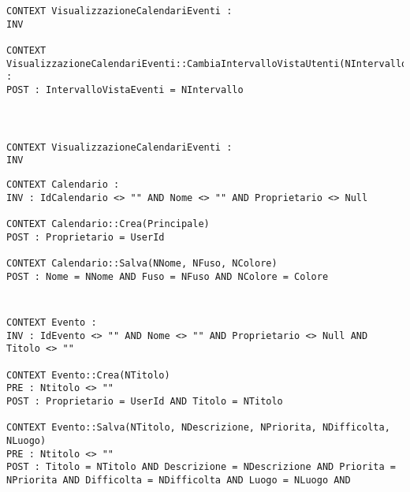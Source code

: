 \begin{listaPersonale}[OCL]{}
    \begin{lstlisting}
CONTEXT VisualizzazioneCalendariEventi :
INV 

CONTEXT VisualizzazioneCalendariEventi::CambiaIntervalloVistaUtenti(NIntervallo) :
POST : IntervalloVistaEventi = NIntervallo
    \end{lstlisting}
    \begin{lstlisting}
    \end{lstlisting}
    \begin{lstlisting}
    \end{lstlisting}
    \begin{lstlisting}
    \end{lstlisting}




    \begin{lstlisting}
CONTEXT VisualizzazioneCalendariEventi :
INV 
    \end{lstlisting}




    \begin{lstlisting}
CONTEXT Calendario :
INV : IdCalendario <> "" AND Nome <> "" AND Proprietario <> Null

CONTEXT Calendario::Crea(Principale)
POST : Proprietario = UserId

CONTEXT Calendario::Salva(NNome, NFuso, NColore)
POST : Nome = NNome AND Fuso = NFuso AND NColore = Colore 
    \end{lstlisting}




    \begin{lstlisting}
    \end{lstlisting}




    \begin{lstlisting}
    \end{lstlisting}




    \begin{lstlisting}
CONTEXT Evento :
INV : IdEvento <> "" AND Nome <> "" AND Proprietario <> Null AND Titolo <> ""

CONTEXT Evento::Crea(NTitolo)
PRE : Ntitolo <> ""
POST : Proprietario = UserId AND Titolo = NTitolo

CONTEXT Evento::Salva(NTitolo, NDescrizione, NPriorita, NDifficolta, NLuogo)
PRE : Ntitolo <> ""
POST : Titolo = NTitolo AND Descrizione = NDescrizione AND Priorita = NPriorita AND Difficolta = NDifficolta AND Luogo = NLuogo AND 
    \end{lstlisting}







\end{listaPersonale}
